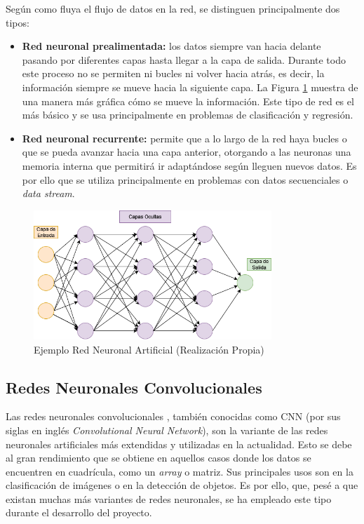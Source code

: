 Según como fluya el flujo de datos en la red, se distinguen principalmente dos tipos:
\begin{itemize}
    \item \textbf{Red neuronal prealimentada:} los datos siempre van hacia delante pasando por diferentes capas hasta llegar a la capa de salida. Durante todo este proceso no se permiten ni bucles ni volver hacia atrás, es decir, la información siempre se mueve hacia la siguiente capa. La Figura \ref{f:redneuronal} muestra de una manera más gráfica cómo se mueve la información. Este tipo de red es el más básico y se usa principalmente en problemas de clasificación y regresión.
    \item \textbf{Red neuronal recurrente:} permite que a lo largo de la red haya bucles o que se pueda avanzar hacia una capa anterior, otorgando a las neuronas una memoria interna que permitirá ir adaptándose según lleguen nuevos datos. Es por ello que se utiliza principalmente en problemas con datos secuenciales o \emph{data stream}.
    
\end{itemize}
\begin{figure}[h]
 \centering
  \includegraphics[width=0.8\textwidth]{img/RedNeuronal.png}
 \caption{Ejemplo Red Neuronal Artificial (Realización Propia)}
 \label{f:redneuronal}
\end{figure}

\subsection{Redes Neuronales Convolucionales}
Las redes neuronales convolucionales \cite{prieto2019redes}, también conocidas como CNN (por sus siglas en inglés \emph{Convolutional Neural Network}), son la variante de las redes neuronales artificiales más extendidas y utilizadas en la actualidad. Esto se debe al gran rendimiento que se obtiene en aquellos casos donde los datos se encuentren en cuadrícula, como un \emph{array} o matriz. Sus principales usos son en la clasificación de imágenes o en la detección de objetos. Es por ello, que, pesé a que existan muchas más variantes de redes neuronales, se ha empleado este tipo durante el desarrollo del proyecto. 

